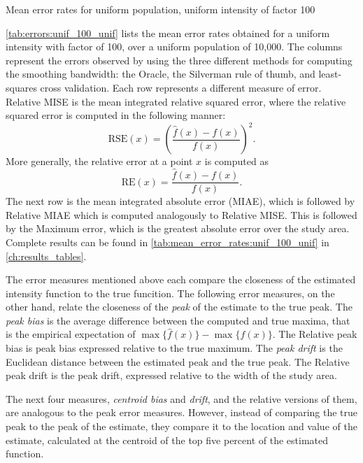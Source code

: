 \begin{table}[htbp]
\centering

\caption{Mean error rates for uniform population, uniform intensity of factor 100}
\label{tab:errors:unif_100_unif}
\end{table}

\autoref{tab:errors:unif_100_unif} lists the mean error rates obtained for a uniform intensity with factor of 100,
over a uniform population of 10,000.
The columns represent the errors observed by using the three different methods for computing the smoothing bandwidth:
the Oracle, the Silverman rule of thumb, and least-squares cross validation.
Each row represents a different measure of error.
Relative MISE is the mean integrated relative squared error,
where the relative squared error is computed in the following manner:
\[ \mbox{RSE}(x) = \left(\frac{\hat{f}(x)-f(x)}{f(x)}\right)^2 .\]
More generally, the relative error at a point \(x\) is computed as
\[ \mbox{RE}(x) =  \frac{\hat{f}(x)-f(x)}{f(x)} .\]
The next row is the mean integrated absolute error (MIAE),
which is followed by Relative MIAE which is computed analogously to Relative MISE.
This is followed by the Maximum error, which is the greatest absolute error over the study area.
Complete results can be found in \autoref{tab:mean_error_rates:unif_100_unif} in \autoref{ch:results_tables}.

The error measures mentioned above each compare the closeness of the estimated intensity function to the true funcition.
The following error measures, on the other hand, relate the closeness of the \textit{peak} of the estimate to the true peak.
The \textit{peak bias} is the average difference between the computed and true maxima,
that is the empirical expectation of \(\max{\{\hat{f}(x)\}} - \max{\{f(x)\}}\).
The Relative peak bias is peak bias expressed relative to the true maximum.
The \textit{peak drift} is the Euclidean distance between the estimated peak and the true peak.
The Relative peak drift is the peak drift, expressed relative to the width of the study area.

The next four measures, \textit{centroid bias} and \textit{drift}, and the relative versions of them, are analogous to the peak error measures.
However, instead of comparing the true peak to the peak of the estimate, they compare it to the location and value of the estimate, calculated at the centroid of the top five percent of the estimated function.

